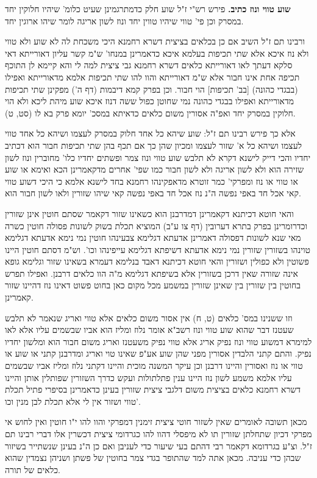 \documentclass[12pt, openany]{book}
\newcommand{\sethebfont}{
\fontsize{10.5pt}{21.0pt} \selectfont
}
\newcommand{\twocol}[1]{
	{\sethebfont \begin{multicols}{2}
			#1
	\end{multicols}}	
}
\begin{document}
\twocol{\textbf{שוע טווי ונוז כתיב.}  פירש רש"י ז"ל שוע חלק כדמתרגמינן שעיט כלומ' שיהיו חלוקין יחד במסרק וכן פי' טווי שיהיו טווין יחד ונוז לשון אריגה לומר שיהו ארוגין יחד.\par  ורבינו תם ז"ל השיב אם כן בכלאים בציצית דשרא רחמנא היכי משכחת לה לא שוע ולא טווי ולא נוז איכא אלא שתי תכיפות בעלמא איכא כדאמרינן במנחו' ש"מ קשר עליון דאורייתא דאי סלקא דעתך לאו דאורייתא כלאים דשרא רחמנא גבי ציצית למה לי והא קיימא לן התוכף תכיפה אחת אינו חבור אלא ש"מ דאורייתא והוו להו שתי תכיפות אלמא מדאורייתא ואפילו (בבגדי כהונה) [בב' תכיפות] הוי חבור. וכן בפרק קמא דיבמות (דף ה') מפקינן שתי תכיפות מדאורייתא ואפילו בבגדי כהונה נמי שחוטן כפול ששה דנוז איכא שוע מיהת ליכא ולא הוי חלוקין במסרק יחד ואפ"ה אסורין משום כלאים כדאיתא במסכ' יומא פרק בא לו (סט, ט).\par  אלא כך פירש רבינו תם ז"ל: שוע שיהא כל אחד חלוק במסרק לעצמו ושיהא כל אחד טווי לעצמו ושיהא כל א' שזור לעצמו ומכיון שהן כך אם תכף בהן שתי תכיפות חבור הוא דכתיב יחדיו והכי דייק לישנא דקרא לא תלבש שוע טווי ונוז צמר ופשתים יחדיו כלו' מחוברין ונוז לשון שזירה הוא ולא לשון אריגה ולא לשון חבור כמו שפי' אחרים מדקאמרינן הכא ואימא או שוע או טווי או נוז ומפרקי' כמר זוטרא מדאפקינהו רחמנא בחד לישנא אלמא כי היכי דשוע טווי קאי אכל חד באפי נפשה ה"נ נוז אכל חד באפי נפשה קאי שיהו שזורין ולאו לשון חבור הוא.\par  והאי חוטא דכיתנא דקאמרינן דמדרבנן הוא כשאינו שזור דקאמר שסתם חוטין אינן שזורין וכדרומרינן בפרק בתרא דערובין (דף צו ע"ב) המוציא תכלת בשוק לשונות פסולה חוטין כשרה מאי שנא לשונות דפסולה דאמרינן אדעתא דגלימא צבעינהו חוטין נמי נימא אדעתא דגלימא טוינהו בשזורין שזורין נמי נימא אדעתא דשיפתא דגלימא עייפינהו וכו'. וש"מ דסתם חוטין היינו פשוטין ולא כפולין ושזורין והאי חוטא דכיתנא דאבד בנלימא דעמרא בשאינו שזור וגלימא גופא אינה שזורה שאין דרכן בשזורין אלא בשיפתא דגלימא מ"ה הוו כלאים דרבנן. ואפילו תפרש בחוטין בין שזורין בין שאינן שזורין במשמע מכל מקום כאן בחוט פשוט דאינו נוז דהיינו שזור קאמרינן.\par וזו ששנינו במס' כלאים (ט, ח) אין אסור משום כלאים אלא טווי ואריג שנאמר לא תלבש שעטנז דבר שהוא שוע טווי ונוז רשב"א אומר נלוז ומליז הוא אביו שבשמים עליו אלא לאו למימרא דמשוע טווי ונוז נפיק אריג אלא טווי נפיק משעטנז ואריג משום חבור הוא ומלשון יחדיו נפיק. והתם קתני הלבדין אסורין מפני שהן שוע אע"פ שאינו טוי ואריג ומדרבנן קתני או שוע או טווי או נוז ואסורין והיינו דרבנן וכן עיקר המשנה מוכית והיינו דקתני נלוז ומליז אביו שבשמים עליו אלמא משמע לשון נוז היינו ענין פתלתולות ועקש כדרך השזורין שפותלין אותן והיינו דשרא רחמנא כלאים בציצית משום דלגבי ציצית שזורין בעינן כדאמרינן בסיפרי פתיל תכלת טווי ושזור אין לי אלא תכלת לבן מנין וכו'.\par מכאן תשובה לאומרים שאין לשזור חוטי ציצית זימנין דמפרקי והוו להו י"ו חוטין ואין לחוש אי מפרקי דכיון שתחלתן שזורין תו לא מיפסלי דהוו להו כגרדומי ציצית דכשרין אלו דברי רבינו תם ז"ל. וצ"ע בגרדומא דקאמר רבי דהתם בעי שיעור כדי לעניבן ואם כן ה"נ בעינן שנשתייר בשיזור שבהן כדי עניבה. מכאן אתה למד שהתופר בגדי צמר בחוטין של פשתן ושניהן נצמדין שהוא כלאים של תורה. 
}
\end{document}
